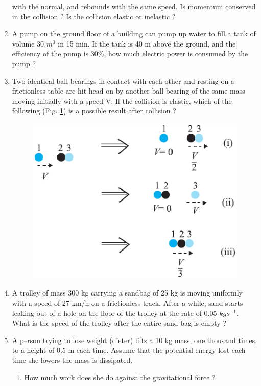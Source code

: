 \begin{enumerate}[label=\arabic*.,ref=\thesection.\theenumi]
with the normal, and rebounds with the same speed. Is momentum conserved in the collision ? Is the collision elastic or inelastic ?
\item A pump on the ground floor of a building can pump up water to fill a tank of volume 30 $m^3$ in 15 min. If the tank is 40 m above the ground, and the efficiency of the pump is 30\%, how much electric power is consumed by the pump ?
\item Two identical ball bearings in contact with each other and resting on a frictionless table are hit head-on by another ball bearing of the same mass moving initially with a speed V. If the collision is elastic, which of the following (Fig. \ref{fig:6.14}) is a possible result after collision ?
\begin{figure}[!ht]
\centering
\includegraphics[width=\columnwidth]{./figs/11-1/6/6.14.eps}
\caption{}
\label{fig:6.14}
\end{figure} 
\item A trolley of mass 300 kg carrying a sandbag of 25 kg is moving uniformly with a speed of 27 km/h on a frictionless track. After a while, sand starts leaking out of a hole on the floor of the trolley at the rate of 0.05 $kg s^{-1}$. What is the speed of the trolley after the entire sand bag is empty ?
\item A person trying to lose weight (dieter) lifts a 10 kg mass, one thousand times, to a height of 0.5 m each time. Assume that the potential energy lost each time she lowers the mass is dissipated. 
\begin{enumerate}[label=(\alph*)]
\item  How much work does she do against the gravitational force ? 

\end{enumerate}
\end{enumerate}
